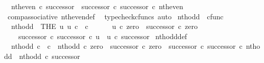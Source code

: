 \begin{isabellebody}
\ \ {\isachardoublequoteopen}nth{\isacharunderscore}{\kern0pt}even\ {\isasymcirc}\isactrlsub c\ successor\ {\isacharequal}{\kern0pt}\ successor\ {\isasymcirc}\isactrlsub c\ successor\ {\isasymcirc}\isactrlsub c\ nth{\isacharunderscore}{\kern0pt}even{\isachardoublequoteclose}\isanewline
%
\isadelimproof
\ \ %
\endisadelimproof
%
\isatagproof
{}\isamarkupfalse%
\ comp{\isacharunderscore}{\kern0pt}associative{}\ nth{\isacharunderscore}{\kern0pt}even{\isacharunderscore}{\kern0pt}def{}\ \isamarkupfalse%
\ {\isacharparenleft}{\kern0pt}typecheck{\isacharunderscore}{\kern0pt}cfuncs{\isacharcomma}{\kern0pt}\ auto{\isacharparenright}{\kern0pt}%
\endisatagproof
{\isafoldproof}%
%
\isadelimproof
%
\endisadelimproof
%
\isadelimdocument
%
\endisadelimdocument
%
\isatagdocument
%
\isamarkuptrue%
%
\endisatagdocument
{\isafolddocument}%
%
\isadelimdocument
%
\endisadelimdocument
{}\isamarkupfalse%
\ nth{\isacharunderscore}{\kern0pt}odd\ {\isacharcolon}{\kern0pt}{\isacharcolon}{\kern0pt}\ {\isachardoublequoteopen}cfunc{\isachardoublequoteclose}\ \isanewline
\ \ {\isachardoublequoteopen}nth{\isacharunderscore}{\kern0pt}odd\ {\isacharequal}{\kern0pt}\ {\isacharparenleft}{\kern0pt}THE\ u{\isachardot}{\kern0pt}\ u{\isacharcolon}{\kern0pt}\ {\isasymnat}\isactrlsub c\ {\isasymrightarrow}\ {\isasymnat}\isactrlsub c\ {\isasymand}\ \isanewline
\ \ \ \ u\ {\isasymcirc}\isactrlsub c\ zero\ {\isacharequal}{\kern0pt}\ successor\ {\isasymcirc}\isactrlsub c\ zero\ {\isasymand}\isanewline
\ \ \ \ {\isacharparenleft}{\kern0pt}successor\ {\isasymcirc}\isactrlsub c\ successor{\isacharparenright}{\kern0pt}\ {\isasymcirc}\isactrlsub c\ u\ {\isacharequal}{\kern0pt}\ u\ {\isasymcirc}\isactrlsub c\ successor{\isacharparenright}{\kern0pt}{\isachardoublequoteclose}\isanewline
\isanewline
{}\isamarkupfalse%
\ nth{\isacharunderscore}{\kern0pt}odd{\isacharunderscore}{\kern0pt}def{}{\isacharcolon}{\kern0pt}\isanewline
\ \ {\isachardoublequoteopen}nth{\isacharunderscore}{\kern0pt}odd{\isacharcolon}{\kern0pt}\ {\isasymnat}\isactrlsub c\ {\isasymrightarrow}\ {\isasymnat}\isactrlsub c\ {\isasymand}\ nth{\isacharunderscore}{\kern0pt}odd\ {\isasymcirc}\isactrlsub c\ zero\ {\isacharequal}{\kern0pt}\ successor\ {\isasymcirc}\isactrlsub c\ zero\ {\isasymand}\ {\isacharparenleft}{\kern0pt}successor\ {\isasymcirc}\isactrlsub c\ successor{\isacharparenright}{\kern0pt}\ {\isasymcirc}\isactrlsub c\ nth{\isacharunderscore}{\kern0pt}odd\ {\isacharequal}{\kern0pt}\ nth{\isacharunderscore}{\kern0pt}odd\ {\isasymcirc}\isactrlsub c\ successor{\isachardoublequoteclose}\isanewline

\end{isabellebody}
